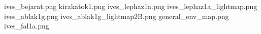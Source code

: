 ives_bejarat.png
kirakatok1.png
ives_lephaz1a.png
ives_lephaz1a_lightmap.png
ives_ablak1g.png
ives_ablak1g_lightmap2B.png
general_env_map.png
ives_fal1a.png
